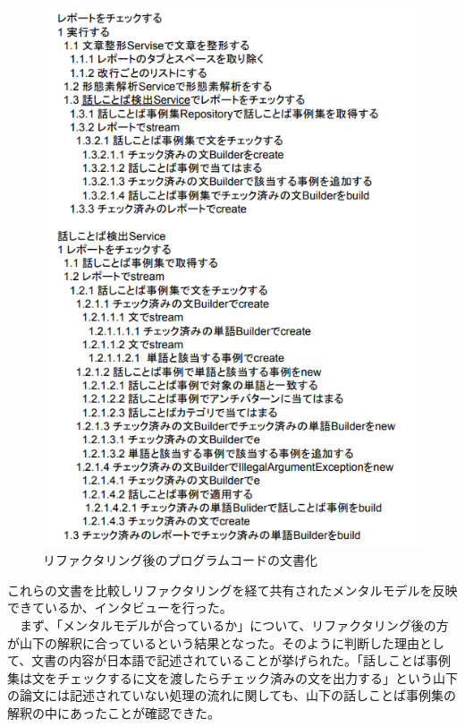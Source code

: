 \documentclass[12pt, a4paper]{jreport}
\begin{document}
\begin{figure}[H]
\centering
\includegraphics[width=1\linewidth]{image/modelAf.png}
\caption{リファクタリング後のプログラムコードの文書化}
\label{fig:enter-label}
\end{figure}
これらの文書を比較しリファクタリングを経て共有されたメンタルモデルを反映できているか、インタビューを行った。
\\　まず、「メンタルモデルが合っているか」について、リファクタリング後の方が山下の解釈に合っているという結果となった。そのように判断した理由として、文書の内容が日本語で記述されていることが挙げられた。「話しことば事例集は文をチェックするに文を渡したらチェック済みの文を出力する」という山下の論文には記述されていない処理の流れに関しても、山下の話しことば事例集の解釈の中にあったことが確認できた。
\end{document}
